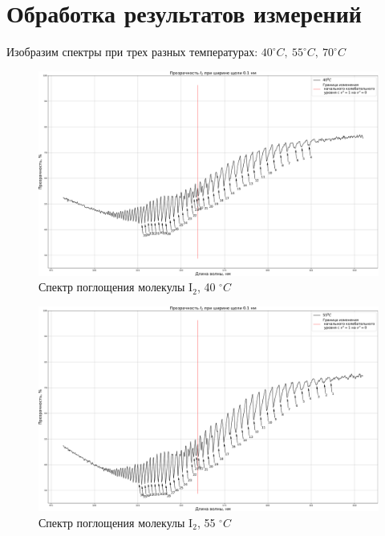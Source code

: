 \newpage
\section{Обработка результатов измерений}
Изобразим спектры при трех разных температурах: $40^\circ C,~ 55^\circ C,~ 70^\circ C$
\begin{figure}[H]%
\centering
\includegraphics[angle = 90, height=0.87\textheight]{data/40_grad}
\caption{Спектр поглощения молекулы I$_2$, 40 $^\circ C$}
\label{40_graph}
\end{figure}
\begin{figure}[H]%
\centering
\includegraphics[angle = 90, height=0.95\textheight]{data/55_grad}
\caption{Спектр поглощения молекулы I$_2$, 55 $^\circ C$}
\label{55_graph}
\end{figure}
